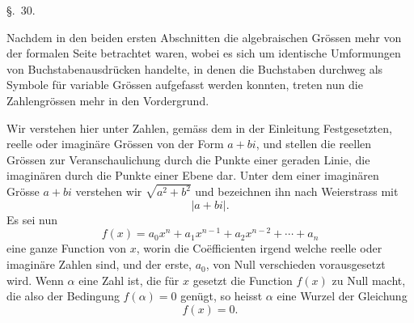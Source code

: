 
\begin{center}
{\Large{}}

\vspace{1em}
{\large{}}
\end{center}

\begin{center}
{\large \S.\ 30.}

\vspace{0.5em}
{\large{}}
\end{center}

Nachdem in den beiden ersten Abschnitten die algebraischen Grössen mehr von der formalen Seite betrachtet waren, wobei es sich um identische Umformungen von Buchstabenausdrücken handelte, in denen die Buchstaben durchweg als Symbole für variable Grössen aufgefasst werden konnten, treten nun die Zahlengrössen mehr in den Vordergrund.

Wir verstehen hier unter Zahlen, gemäss dem in der Einleitung Festgesetzten, reelle oder imaginäre Grössen von der Form $a+bi$, und stellen die reellen Grössen zur Veranschaulichung durch die Punkte einer geraden Linie, die imaginären durch die Punkte einer Ebene dar. Unter dem  einer imaginären Grösse $a+bi$ verstehen wir $\sqrt{a^2+b^2}$ und bezeichnen ihn nach Weierstrass mit
\[
 |a+bi|.
\]
Es sei nun
\begin{equation}
 f(x)=a_0x^n+a_1x^{n-1}+a_2x^{n-2}+\cdots+a_n
\tag{1}
\end{equation}
eine ganze Function von $x$, worin die Coëfficienten irgend welche reelle oder imaginäre Zahlen sind, und der erste, $a_0$, von Null verschieden vorausgesetzt wird. Wenn $\alpha$ eine Zahl ist, die für $x$ gesetzt die Function $f(x)$ zu Null macht, die also der Bedingung $f(\alpha)=0$ genügt, so heisst $\alpha$ eine Wurzel der Gleichung
\[
 f(x)=0.
\]
